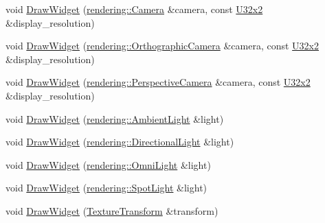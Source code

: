 \begin{DoxyCompactItemize}
\item 
void \mbox{\hyperlink{namespacemage_1_1script_1_1anonymous__namespace_02editor__script_8cpp_03_a0ccfdbcbbed7eb38dda2119cd6d91c5e}{Draw\+Widget}} (\mbox{\hyperlink{classmage_1_1rendering_1_1_camera}{rendering\+::\+Camera}} \&camera, const \mbox{\hyperlink{namespacemage_ae5e7ccf8a1785baaacf57b3a0f4324e2}{U32x2}} \&display\+\_\+resolution)
\item 
void \mbox{\hyperlink{namespacemage_1_1script_1_1anonymous__namespace_02editor__script_8cpp_03_a8245978cf439e5e006cc04a5e3b8c454}{Draw\+Widget}} (\mbox{\hyperlink{classmage_1_1rendering_1_1_orthographic_camera}{rendering\+::\+Orthographic\+Camera}} \&camera, const \mbox{\hyperlink{namespacemage_ae5e7ccf8a1785baaacf57b3a0f4324e2}{U32x2}} \&display\+\_\+resolution)
\item 
void \mbox{\hyperlink{namespacemage_1_1script_1_1anonymous__namespace_02editor__script_8cpp_03_a30d488a4869cbdc33a95a38eb2754277}{Draw\+Widget}} (\mbox{\hyperlink{classmage_1_1rendering_1_1_perspective_camera}{rendering\+::\+Perspective\+Camera}} \&camera, const \mbox{\hyperlink{namespacemage_ae5e7ccf8a1785baaacf57b3a0f4324e2}{U32x2}} \&display\+\_\+resolution)
\item 
void \mbox{\hyperlink{namespacemage_1_1script_1_1anonymous__namespace_02editor__script_8cpp_03_a8fae9ee9468220d523f8342c0b84d577}{Draw\+Widget}} (\mbox{\hyperlink{classmage_1_1rendering_1_1_ambient_light}{rendering\+::\+Ambient\+Light}} \&light)
\item 
void \mbox{\hyperlink{namespacemage_1_1script_1_1anonymous__namespace_02editor__script_8cpp_03_ae09b38a4a757ecd67e944a9605030d03}{Draw\+Widget}} (\mbox{\hyperlink{classmage_1_1rendering_1_1_directional_light}{rendering\+::\+Directional\+Light}} \&light)
\item 
void \mbox{\hyperlink{namespacemage_1_1script_1_1anonymous__namespace_02editor__script_8cpp_03_a6be8a0f5d812d1d6ef9f2b6227213f77}{Draw\+Widget}} (\mbox{\hyperlink{classmage_1_1rendering_1_1_omni_light}{rendering\+::\+Omni\+Light}} \&light)
\item 
void \mbox{\hyperlink{namespacemage_1_1script_1_1anonymous__namespace_02editor__script_8cpp_03_a4a986ab674be382e62fe0c0eda23bd3a}{Draw\+Widget}} (\mbox{\hyperlink{classmage_1_1rendering_1_1_spot_light}{rendering\+::\+Spot\+Light}} \&light)
\item 
void \mbox{\hyperlink{namespacemage_1_1script_1_1anonymous__namespace_02editor__script_8cpp_03_a7bbc1424508f604bffd94a90a823bd62}{Draw\+Widget}} (\mbox{\hyperlink{classmage_1_1_texture_transform}{Texture\+Transform}} \&transform)

\end{DoxyCompactItemize}
